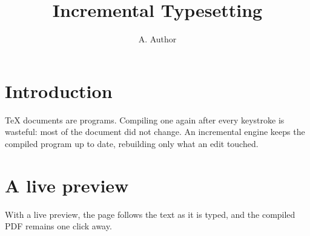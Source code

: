 \documentclass{article}
\title{Incremental Typesetting}
\author{A. Author}
\date{}
\begin{document}
\maketitle

\section{Introduction}
TeX documents are programs. Compiling one again after every keystroke is
wasteful: most of the document did not change. An incremental engine keeps
the compiled program up to date, rebuilding only what an edit touched.

\section{A live preview}
With a live preview, the page follows the text as it is typed, and the
compiled PDF remains one click away.
\end{document}
